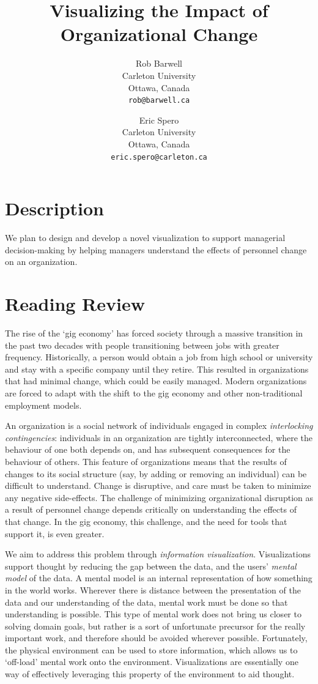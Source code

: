 \documentclass[12pt,letterpaper]{article}
\title{Visualizing the Impact of Organizational Change}
\author{
  Rob Barwell\\ %
  \small \vspace{-.15cm}Carleton University\\
  \small Ottawa, Canada\\
  \small \texttt{rob@barwell.ca}
       \and
Eric Spero\\ %
       \small \vspace{-.15cm}Carleton University\\
       \small Ottawa, Canada\\
       \small \texttt{eric.spero@carleton.ca}
}
\begin{document}
\maketitle

\section{Description}

We plan to design and develop a novel visualization to support managerial decision-making by helping managers understand the effects of personnel change on an organization.

\section{Reading Review}

The rise of the \lq gig economy\rq{}\cite{de2015rise,friedman2014workers} has forced society through a massive transition in the past two decades with people transitioning between jobs with greater frequency.  Historically, a person would obtain a job from high school or university and stay with a specific company until they retire.  This resulted in organizations that had minimal change, which could be easily managed. Modern organizations are forced to adapt with the shift to the gig economy and other non-traditional employment models.  

An organization is a social network\cite{scott1988social} of individuals engaged in complex \emph{interlocking contingencies}\cite{glenn2006complexity}: individuals in an organization are tightly interconnected, where the behaviour of one both depends on, and has subsequent consequences for the behaviour of others\cite{glenn2006complexity}. This feature of organizations means that the results of changes to its social structure (say, by adding or removing an individual) can be difficult to understand. Change is disruptive, and care must be taken to minimize any negative side-effects. The challenge of minimizing organizational disruption as a result of personnel change depends critically on understanding the effects of that change. In the gig economy, this challenge, and the need for tools that support it, is even greater. 

We aim to address this problem through \emph{information visualization}. Visualizations support thought by reducing the gap between the data, and the users' \emph{mental model} of the data\cite{yi2007toward}. A mental model is an internal representation of how something in the world works\cite{staggersmodel,norman2014some}. Wherever there is distance between the presentation of the data and our understanding of the data, mental work must be done so that understanding is possible. This type of mental work does not bring us closer to solving domain goals, but rather is a sort of unfortunate precursor for the really important work, and therefore should be avoided wherever possible\cite{paas2003cognitive}. Fortunately, the physical environment can be used to store information, which allows us to \lq off-load\rq{} mental work onto the environment\cite{wilson2002six}. Visualizations are essentially one way of effectively leveraging this property of the environment to aid thought.
\end{document}
